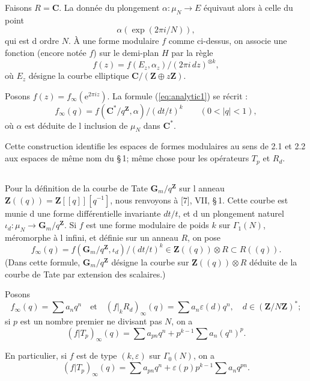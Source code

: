 \documentclass[11pt]{amsart}
\theoremstyle{plain}
\theoremstyle{definition}
\theoremstyle{remark}
\newcommand{\Z}{\mathbf{Z}}
\newcommand{\C}{\mathbf{C}}
\begin{document}
Faisons $R = \C$. La donnée du plongement $\alpha : \mu_N \to E$ équivaut alors à celle du point
$$
\alpha(\exp(2\pi i/N)),
$$
qui est d ordre $N$. À une forme modulaire $f$ comme ci-dessus, on associe une fonction (encore notée $f$) sur le demi-plan $H$ par la règle
\begin{equation}
\label{eq:analytic1}
f(z) = f(E_z, \alpha_z) / (2\pi i \, dz)^{\otimes k},
\end{equation}
où $E_z$ désigne la courbe elliptique $\C/(\Z \oplus z\Z)$.

Posons $f(z) = f_{\infty}(\mathrm{e}^{2\pi iz})$. La formule (\ref{eq:analytic1}) se récrit :
\begin{equation}
\label{eq:analytic2}
f_{\infty}(q) = f(\C^*/q^\Z, \alpha) / (dt/t)^k \qquad (0 < |q| < 1),
\end{equation}
où $\alpha$ est déduite de l inclusion de $\mu_N$ dans $\C^*$.

Cette construction identifie les espaces de formes modulaires au sens de 2.1 et 2.2 aux espaces de même nom du \S\,1; même chose pour les opérateurs $T_p$ et $R_d$.

\subsection{}

Pour la définition de la courbe de Tate $\mathbf{G}_m/q^\Z$ sur l anneau $\Z((q)) = \Z[[q]][q^{-1}]$, nous renvoyons à [7], VII, \S\,1. Cette courbe est munie d une forme différentielle invariante $dt/t$, et d un plongement naturel $\iota_d : \mu_N \to \mathbf{G}_m/q^\Z$. Si $f$ est une forme modulaire de poids $k$ sur $\Gamma_1(N)$, méromorphe à l infini, et définie sur un anneau $R$, on pose
$$
f_{\infty}(q) = f(\mathbf{G}_m/q^\Z, \iota_d) / (dt/t)^k \in \Z((q)) \otimes R \subset R((q)).
$$
(Dans cette formule, $\mathbf{G}_m/q^\Z$ désigne la courbe sur $\Z((q)) \otimes R$ déduite de la courbe de Tate par extension des scalaires.)

Posons
$$
f_{\infty}(q) = \sum a_n q^n \quad \text{et} \quad (f|_k R_d)_{\infty}(q) = \sum a_n \varepsilon(d) q^n, \quad d \in (\Z/N\Z)^*;
$$
si $p$ est un nombre premier ne divisant pas $N$, on a
\begin{equation}
\label{eq:hecke-tate}
(f|T_p)_{\infty}(q) = \sum a_{pn} q^n + p^{k-1} \sum a_n (q^n)^p.
\end{equation}

En particulier, si $f$ est de type $(k,\varepsilon)$ sur $\Gamma_0(N)$, on a
\begin{equation}
\label{eq:hecke-tate2}
(f|T_p)_{\infty}(q) = \sum a_{pn} q^n + \varepsilon(p) p^{k-1} \sum a_n q^{pn}.
\end{equation}
\end{document}
